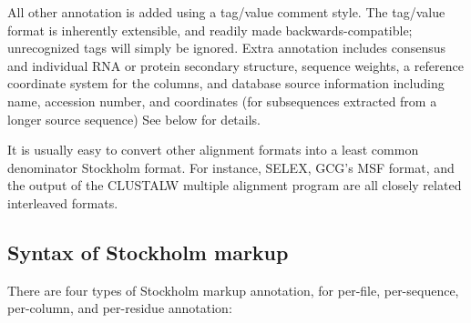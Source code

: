 All other annotation is added using a tag/value comment style. The
tag/value format is inherently extensible, and readily made
backwards-compatible; unrecognized tags will simply be ignored. Extra
annotation includes consensus and individual RNA or protein secondary
structure, sequence weights, a reference coordinate system for the
columns, and database source information including name, accession
number, and coordinates (for subsequences extracted from a longer
source sequence) See below for details.

It is usually easy to convert other alignment formats into a least
common denominator Stockholm format. For instance, SELEX, GCG's MSF
format, and the output of the CLUSTALW multiple alignment program are
all closely related interleaved formats.



\subsection{Syntax of Stockholm markup}

There are four types of Stockholm markup annotation, for per-file,
per-sequence, per-column, and per-residue annotation:


